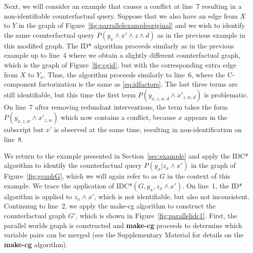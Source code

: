 Next, we will consider an example that causes a conflict at line~7 resulting in a non-identifiable counterfactual query. Suppose that we also have an edge from \(X\) to \(Y\) in the graph of Figure~\ref{fig:parrallelexampleoriginal} and we wish to identify the same counterfactual query \(P(y_x \wedge x' \wedge z \wedge d)\) as in the previous example in this modified graph. The ID* algorithm proceeds similarly as in the previous example up to line~4 where we obtain a slightly different counterfactual graph, which is the graph of Figure~\ref{fig:cgid}, but with the corresponding extra edge from \(X\) to \(Y_x\). Thus, the algorithm proceeds similarly to line~6, where the C-component factorization is the same as \eqref{eq:idfactors}. The last three terms are still identifiable, but this time the first term \(P(y_{x,z,w,d} \wedge x'_{z,w,d})\) is problematic. On line~7 after removing redundant interventions, the term takes the form \(P(y_{x,z,w} \wedge x'_{z,w})\) which now contains a conflict, because \(x\) appears in the subscript but \(x'\) is observed at the same time, resulting in non-identification on line~8.



We return to the example presented in Section~\ref{sec:example} and apply the IDC* algorithm to identify the counterfactual query \(P(y_x| z_x \wedge x')\) in the graph of Figure~\ref{fig:graphG}, which we will again refer to as \(G\) in the context of this example. We trace the application of IDC*\((G, y_x, z_x \wedge x')\). On line~1, the ID* algorithm is applied to \(z_x \wedge x'\), which is not identifiable, but also not inconsistent. Continuing to line~2, we apply the make-cg algorithm to construct the counterfactual graph \(G'\), which is shown in Figure~\ref{fig:parallelidc1}. First, the parallel worlds graph is constructed and \textbf{make-cg} proceeds to determine which variable pairs can be merged (see the Supplementary Material for details on the \textbf{make-cg} algorithm). 

